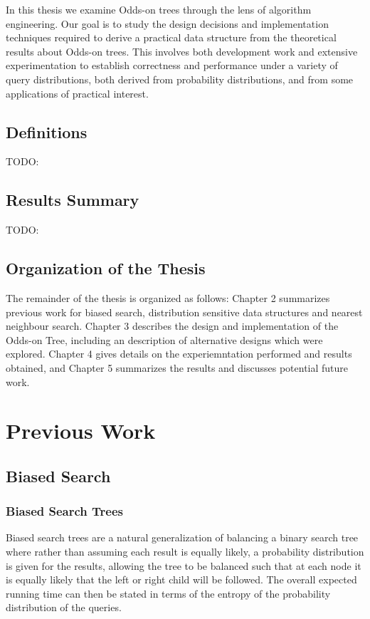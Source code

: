 \documentclass[mcs]{scsthesis}
\begin{document}
In this thesis we examine Odds-on trees through the lens of algorithm
engineering.  Our goal is to study the design decisions and implementation 
techniques required to derive a practical data structure from the theoretical
results about Odds-on trees.  This involves both development work and
extensive experimentation to establish correctness and performance under a
variety of query distributions, both derived from probability distributions,
and from some applications of practical interest.  

\section{Definitions}

TODO:

\section{Results Summary}

TODO:

\section{Organization of the Thesis}

The remainder of the thesis is organized as follows: Chapter 2 summarizes
previous work for biased search, distribution sensitive data structures and
nearest neighbour search.  Chapter 3 describes the design and implementation of
the Odds-on Tree, including an description of alternative designs which were
explored.  Chapter 4 gives details on the experiemntation performed and results
obtained, and Chapter 5 summarizes the results and discusses potential 
future work.

\chapter{Previous Work}

\section{Biased Search}

\subsection{Biased Search Trees}

Biased search trees are a natural generalization of balancing a binary search
tree where rather than assuming each result is equally likely, a probability
distribution is given for the results, allowing the tree to be balanced such
that at each node it is equally likely that the left or right child will be
followed.  The overall expected running time can then be stated in terms of the
entropy of the probability distribution of the queries.
\end{document}
